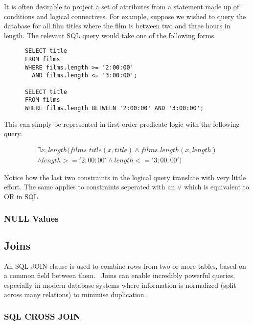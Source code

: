 \documentclass[a4paper, 11pt]{article}
\begin{document}
      It is often desirable to project a set of attributes from a statement
      made up of conditions and logical connectives. For example, suppose we
      wished to query the database for all film titles where the film is between 
      two and three hours in length. The relevant SQL query would take one of
      the following forms.

      \begin{verbatim}
      SELECT title
      FROM films
      WHERE films.length >= '2:00:00'
        AND films.length <= '3:00:00';

      SELECT title
      FROM films
      WHERE films.length BETWEEN '2:00:00' AND '3:00:00';
      \end{verbatim}

      This can simply be represented in first-order predicate logic with the
      following query.

      \begin{gather}
        \exists x, length(films\_title(x, title) \land films\_length(x,
        length)\\
        \land length >= '2:00:00' \land length <= '3:00:00')
      \end{gather}

      Notice how the last two constraints in the logical query translate
      with very little effort. The same applies to constraints seperated with
      an $\lor$ which is equivalent to OR in SQL.

    \subsubsection{NULL Values}


  \subsection{Joins}
    \label{sec:joins}

    An SQL JOIN clause is used to combine rows from two or more tables, based
    on a common field between them.~\cite{w3JOINS} Joins can enable incredibly
    powerful queries, especially in modern database systems where information
    is normalized (split across many relations) to minimise duplication.

    \subsubsection{SQL CROSS JOIN}
\end{document}
